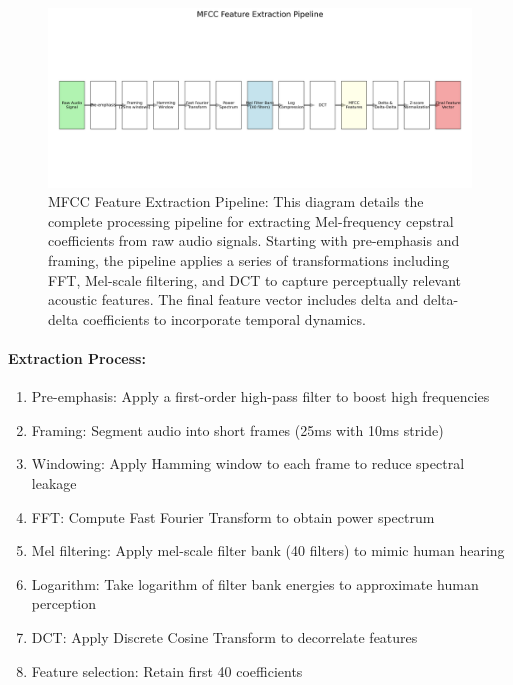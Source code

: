 \documentclass[12pt]{article}
\begin{document}
\begin{figure}[h]
    \centering
    \includegraphics[width=1.0\linewidth]{Figures/mfcc_pipeline.png}
    \caption{MFCC Feature Extraction Pipeline: This diagram details the complete processing pipeline for extracting Mel-frequency cepstral coefficients from raw audio signals. Starting with pre-emphasis and framing, the pipeline applies a series of transformations including FFT, Mel-scale filtering, and DCT to capture perceptually relevant acoustic features. The final feature vector includes delta and delta-delta coefficients to incorporate temporal dynamics.}
    \label{fig:mfcc_pipeline}
\end{figure}

\paragraph{Extraction Process:}
\begin{enumerate}
    \item Pre-emphasis: Apply a first-order high-pass filter to boost high frequencies
    \item Framing: Segment audio into short frames (25ms with 10ms stride)
    \item Windowing: Apply Hamming window to each frame to reduce spectral leakage
    \item FFT: Compute Fast Fourier Transform to obtain power spectrum
    \item Mel filtering: Apply mel-scale filter bank (40 filters) to mimic human hearing
    \item Logarithm: Take logarithm of filter bank energies to approximate human perception
    \item DCT: Apply Discrete Cosine Transform to decorrelate features
    \item Feature selection: Retain first 40 coefficients
\end{enumerate}
\end{document}
